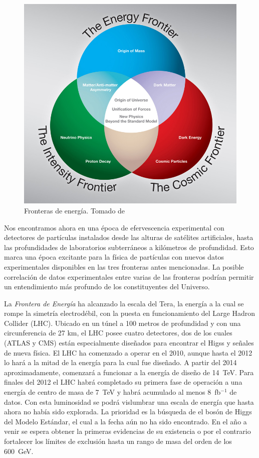 \begin{figure}
  \centering
\includegraphics[scale=0.3]{three-frontiers-large}
  \caption{Fronteras de energía. Tomado de \cite{fermilab}}
  \label{fig:1}
\end{figure}

Nos encontramos ahora en una época de efervescencia experimental con
detectores de partículas instalados desde las alturas de satélites
artificiales, hasta las profundidades de laboratorios subterráneos a
kilómetros de profundidad. Esto marca una época excitante para la
física de partículas con nuevos datos experimentales disponibles en
las tres fronteras antes mencionadas. La posible correlación de datos
experimentales entre varias de las fronteras podrían permitir un
entendimiento más profundo de los constituyentes del Universo.

La \emph{Frontera de Energía} ha alcanzado la escala del Tera, la
energía a la cual se rompe la simetría electrodébil, con la puesta en
funcionamiento del Large Hadron Collider (LHC). Ubicado en un túnel a
100 metros de profundidad y con una circunferencia de 27 km, el LHC
posee cuatro detectores, dos de los cuales (ATLAS y CMS) están
especialmente diseñados para encontrar el Higss y señales de nueva física. El LHC
ha comenzado a operar en el 2010, aunque hasta el 2012 lo hará a la
mitad de la energía para la cual fue diseñado. A partir del 2014
aproximadamente, comenzará a funcionar a la energía de diseño de
14~TeV. Para finales del 2012 el LHC habrá completado su primera fase
de operación a una energía de centro de masa de 7~TeV y habrá
acumulado al menos 8~fb$^{-1}$ de datos. Con esta luminosidad se podrá
vislumbrar una escala de energía que hasta ahora no había sido
explorada. La prioridad es la búsqueda de el bosón de Higgs del Modelo Estándar,
el cual a la fecha aún no ha sido encontrado. En el año a venir
se espera obtener la primeras evidencias de su existencia o
por el contrario fortalecer los límites de exclusión hasta un rango de masa
del orden de los 600~GeV.

